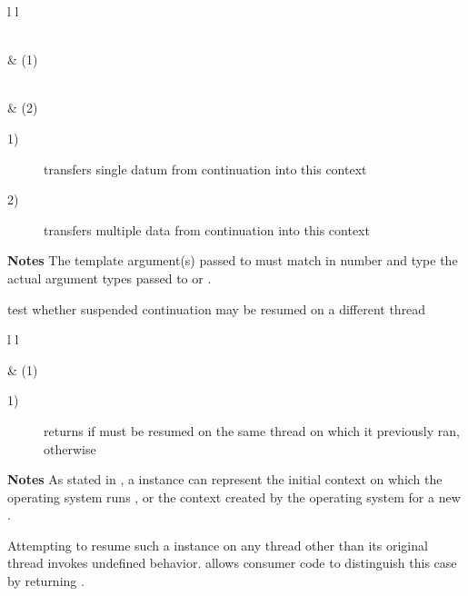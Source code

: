 \begin{tabular}{ l l }
    \midrule

    \\
     & (1)\\

    \midrule

    \\
     & (2)\\

    \midrule
\end{tabular}

\begin{description}
    \item[1)] transfers single datum from continuation  into this context
    \item[2)] transfers multiple data from continuation  into this
              context
\end{description}

{\bfseries Notes}
\newline
The template argument(s) passed to  must match in number and
type the actual argument types passed to \call or \op.


test whether suspended continuation may be resumed on a different thread\\

\begin{tabular}{ l l }
    \midrule

     & (1)\\

    \midrule
\end{tabular}

\begin{description}
    \item[1)] returns  if  must be resumed on the same
              thread on which it previously ran,  otherwise
\end{description}

{\bfseries Notes}
\newline
As stated in , a \cont instance can represent the initial
context on which the operating system runs \main, or the context created by
the operating system for a new .

Attempting to resume such a \cont instance on any thread other than its
original thread invokes undefined behavior.  allows
consumer code to distinguish this case by returning .
